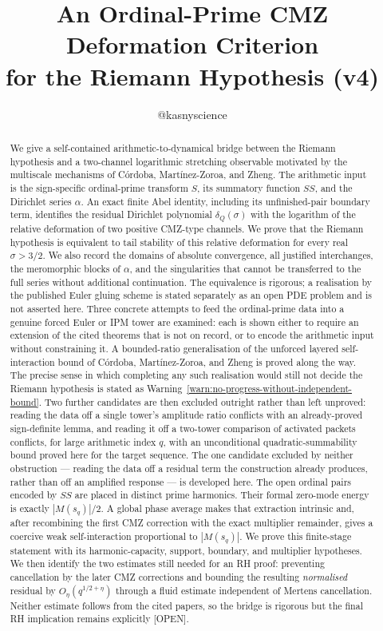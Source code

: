 \documentclass[11pt]{amsart}
\title{An Ordinal-Prime CMZ Deformation Criterion\\
for the Riemann Hypothesis (v4)}
\author{@kasnyscience}
\date{}
\numberwithin{equation}{section}
\theoremstyle{plain}
\theoremstyle{definition}
\theoremstyle{remark}
\begin{document}
\begin{abstract}
We give a self-contained arithmetic-to-dynamical bridge between the Riemann
hypothesis and a two-channel logarithmic stretching observable motivated by
the multiscale mechanisms of C\'ordoba, Mart\'inez-Zoroa, and Zheng.  The
arithmetic input is the sign-specific ordinal-prime transform $S$, its
summatory function $SS$, and the Dirichlet series $\alpha$.  An exact finite
Abel identity, including its unfinished-pair boundary term, identifies the
residual Dirichlet polynomial $\delta_Q(\sigma)$ with the logarithm of the
relative deformation of two positive CMZ-type channels.  We prove that the
Riemann hypothesis is equivalent to tail stability of this relative
deformation for every real $\sigma>3/2$.  We also record the domains of
absolute convergence, all justified interchanges, the meromorphic blocks of
$\alpha$, and the singularities that cannot be transferred to the full
series without additional continuation.  The equivalence is rigorous; a
realisation by the published Euler gluing scheme is stated separately as an
open PDE problem and is not asserted here.  Three concrete attempts to feed
the ordinal-prime data into a genuine forced Euler or IPM tower are examined:
each is shown either to require an extension of the cited theorems that is
not on record, or to encode the arithmetic input without constraining it.  A
bounded-ratio generalisation of the unforced layered self-interaction bound
of C\'ordoba, Mart\'inez-Zoroa, and Zheng is proved along the way.  The
precise sense in which completing any such realisation would still not
decide the Riemann hypothesis is stated as
Warning~\ref{warn:no-progress-without-independent-bound}.  Two further
candidates are then excluded outright rather than left unproved: reading
the data off a single tower's amplitude ratio conflicts with an
already-proved sign-definite lemma, and reading it off a two-tower
comparison of activated packets conflicts, for large arithmetic index $q$,
with an unconditional quadratic-summability bound proved here for the
target sequence.  The one candidate excluded by neither obstruction ---
reading the data off a residual term the construction already produces,
rather than off an amplified response --- is developed here.  The open
ordinal pairs encoded by $SS$ are placed in distinct prime harmonics.  Their
formal zero-mode energy is exactly $|M(s_q)|/2$.  A global phase average makes
that extraction intrinsic and, after recombining the first CMZ correction
with the exact multiplier remainder, gives a coercive weak self-interaction
proportional to $|M(s_q)|$.  We prove this finite-stage statement with its
harmonic-capacity, support, boundary, and multiplier hypotheses.  We then
identify the two estimates still needed for an RH proof: preventing
cancellation by the later CMZ corrections and bounding the resulting
\emph{normalised} residual by $O_\eta(q^{1/2+\eta})$ through a fluid estimate
independent of Mertens cancellation.  Neither estimate follows from the
cited papers, so the bridge is rigorous but the final RH implication remains
explicitly \textup{[OPEN]}.
\end{abstract}
\end{document}
